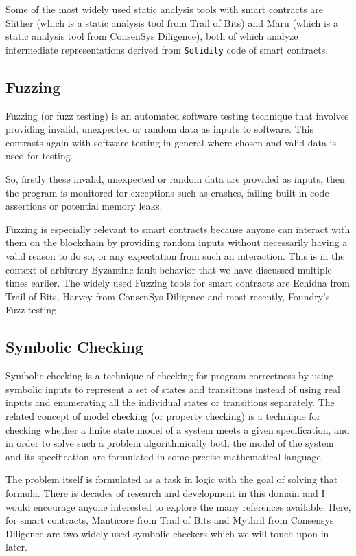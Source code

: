 Some of the most widely used static analysis tools with smart contracts
are Slither (which is a static analysis tool from Trail of Bits) and
Maru (which is a static analysis tool from ConsenSys Diligence), both of
which analyze intermediate representations derived from
\texttt{Solidity} code of smart contracts.

\subsection{Fuzzing}\label{fuzzing}

Fuzzing (or fuzz testing) is an automated software testing technique
that involves providing invalid, unexpected or random data as inputs to
software. This contrasts again with software testing in general where
chosen and valid data is used for testing.

So, firstly these invalid, unexpected or random data are provided as
inputs, then the program is monitored for exceptions such as crashes,
failing built-in code assertions or potential memory leaks.

Fuzzing is especially relevant to smart contracts because anyone can
interact with them on the blockchain by providing random inputs without
necessarily having a valid reason to do so, or any expectation from such
an interaction. This is in the context of arbitrary Byzantine fault
behavior that we have discussed multiple times earlier. The widely used
Fuzzing tools for smart contracts are Echidna from Trail of Bits, Harvey
from ConsenSys Diligence and most recently, Foundry's Fuzz testing.

\subsection{Symbolic Checking}\label{symbolic-checking}

Symbolic checking is a technique of checking for program correctness by
using symbolic inputs to represent a set of states and transitions
instead of using real inputs and enumerating all the individual states
or transitions separately. The related concept of model checking (or
property checking) is a technique for checking whether a finite state
model of a system meets a given specification, and in order to solve
such a problem algorithmically both the model of the system and its
specification are formulated in some precise mathematical language.

The problem itself is formulated as a task in logic with the goal of
solving that formula. There is decades of research and development in
this domain and I would encourage anyone interested to explore the many
references available. Here, for smart contracts, Manticore from Trail of
Bits and Mythril from Consensys Diligence are two widely used symbolic
checkers which we will touch upon in later.

